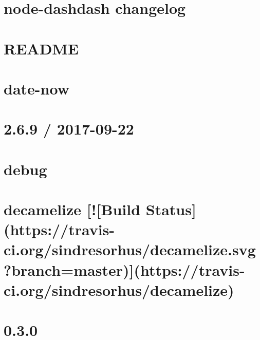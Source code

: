 \documentclass[twoside]{book}
\newcommand{\+}{\discretionary{\mbox{\scriptsize$\hookleftarrow$}}{}{}}
\begin{document}
\chapter{node-\/dashdash changelog}
\label{md_dsmacc_examples_DRmerge_node_modules_dashdash_CHANGES}

\chapter{R\+E\+A\+D\+ME}
\label{md_dsmacc_examples_DRmerge_node_modules_dashdash_README}

\chapter{date-\/now}
\label{md_dsmacc_examples_DRmerge_node_modules_date-now_README}

\chapter{2.6.9 / 2017-\/09-\/22}
\label{md_dsmacc_examples_DRmerge_node_modules_debug_CHANGELOG}

\chapter{debug}
\label{md_dsmacc_examples_DRmerge_node_modules_debug_README}

\chapter{decamelize \mbox{[}!\mbox{[}Build Status\mbox{]}(https\+://travis-\/ci.org/sindresorhus/decamelize.svg?branch=master)\mbox{]}(https\+://travis-\/ci.org/sindresorhus/decamelize)}
\label{md_dsmacc_examples_DRmerge_node_modules_decamelize_readme}

\chapter{0.3.0}
\label{md_dsmacc_examples_DRmerge_node_modules_decompress-zip_changelog}

\end{document}
